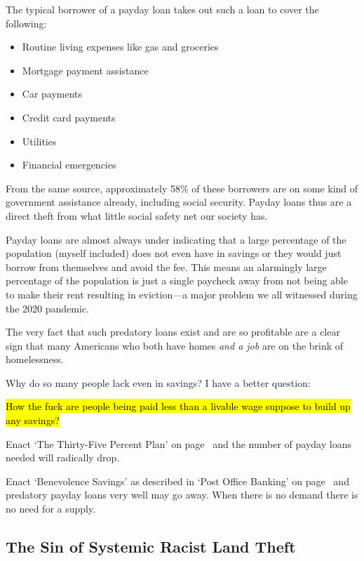The typical borrower of a payday loan takes out such a loan to cover the following:

\begin{itemize}
  \item Routine living expenses like gas and groceries
  \item Mortgage payment assistance
  \item Car payments
  \item Credit card payments
  \item Utilities
  \item Financial emergencies
\end{itemize}

From the same source, approximately 58\% of these borrowers are on some kind of government assistance already, including social security. Payday loans thus are a direct theft from what little social safety net our society has.

Payday loans are almost always under  indicating that a large percentage of the population (myself included) does not even have  in savings or they would just borrow from themselves and avoid the fee. This means an alarmingly large percentage of the population is just a single paycheck away from not being able to make their rent resulting in eviction---a major problem we all witnessed during the 2020 pandemic.

The very fact that such predatory loans exist and are so profitable are a clear sign that many Americans who both have homes \emph{and a job} are on the brink of homelessness.

Why do so many people lack even  in savings? I have a better question:

\bigskip

\hl{How the fuck are people being paid less than a livable wage suppose to build up any savings?}

\bigskip

Enact `The Thirty-Five Percent Plan' on page~\pageref{thirtyfive} and the number of payday loans needed will radically drop.

Enact `Benevolence Savings' as described in `Post Office Banking' on page~\pageref{bsavings} and predatory payday loans very well may go away. When there is no demand there is no need for a supply.

\subsection{The Sin of Systemic Racist Land Theft}

